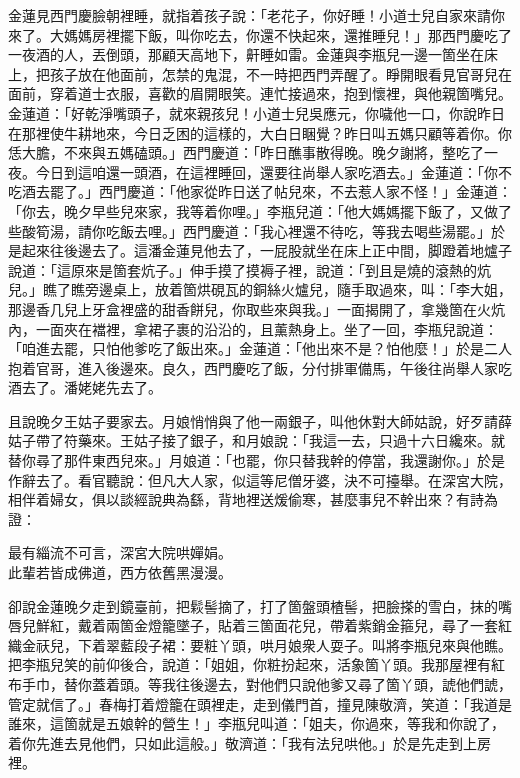 金蓮見西門慶臉朝裡睡，就指着孩子說：「老花子，你好睡！小道士兒自家來請你來了。大媽媽房裡擺下飯，叫你吃去，你還不快起來，還推睡兒！」那西門慶吃了一夜酒的人，丟倒頭，那顧天高地下，鼾睡如雷。金蓮與李瓶兒一邊一箇坐在床上，把孩子放在他面前，怎禁的鬼混，不一時把西門弄醒了。睜開眼看見官哥兒在面前，穿着道士衣服，喜歡的眉開眼笑。連忙接過來，抱到懷裡，與他親箇嘴兒。金蓮道：「好乾淨嘴頭子，就來親孩兒！小道士兒吳應元，你噦他一口，你說昨日在那裡使牛耕地來，今日乏困的這樣的，大白日睏覺？昨日叫五媽只顧等着你。你恁大膽，不來與五媽磕頭。」{}西門慶道：「昨日醮事散得晚。晚夕謝將，整吃了一夜。今日到這咱還一頭酒，在這裡睡回，還要往尚舉人家吃酒去。」金蓮道：「你不吃酒去罷了。」西門慶道：「他家從昨日送了帖兒來，不去惹人家不怪！」金蓮道：「你去，晚夕早些兒來家，我等着你哩。」李瓶兒道：「他大媽媽擺下飯了，又做了些酸筍湯，請你吃飯去哩。」西門慶道：「我心裡還不待吃，等我去喝些湯罷。」於是起來往後邊去了。這潘金蓮見他去了，一屁股就坐在床上正中間，脚蹬着地爐子說道：「這原來是箇套炕子。」伸手摸了摸褥子裡，說道：「到且是燒的滾熱的炕兒。」瞧了瞧旁邊桌上，放着箇烘硯瓦的銅絲火爐兒，隨手取過來，叫：「李大姐，那邊香几兒上牙盒裡盛的甜香餅兒，你取些來與我。」一面揭開了，拿幾箇在火炕內，一面夾在襠裡，拿裙子裹的沿沿的，且薰熱身上。坐了一回，李瓶兒說道：「咱進去罷，只怕他爹吃了飯出來。」金蓮道：「他出來不是？怕他麼！」於是二人抱着官哥，進入後邊來。良久，西門慶吃了飯，分付排軍備馬，午後往尚舉人家吃酒去了。潘姥姥先去了。

且說晚夕王姑子要家去。月娘悄悄與了他一兩銀子，叫他休對大師姑說，好歹請薛姑子帶了符藥來。王姑子接了銀子，和月娘說：「我這一去，只過十六日纔來。就替你尋了那件東西兒來。」月娘道：「也罷，你只替我幹的停當，我還謝你。」於是作辭去了。看官聽說：但凡大人家，似這等尼僧牙婆，決不可擡舉。在深宮大院，相伴着婦女，俱以談經說典為繇，背地裡送煖偷寒，甚麼事兒不幹出來？有詩為證：

\begin{myquote}
最有緇流不可言，深宮大院哄嬋娟。\\此輩若皆成佛道，西方依舊黑漫漫。
\end{myquote}

卻說金蓮晚夕走到鏡臺前，把鬏髻摘了，打了箇盤頭楂髻，把臉搽的雪白，抹的嘴唇兒鮮紅，戴着兩箇金燈籠墜子，貼着三箇面花兒，帶着紫銷金箍兒，尋了一套紅織金祆兒，下着翠藍段子裙：要粧丫頭，哄月娘衆人耍子。叫將李瓶兒來與他瞧。把李瓶兒笑的前仰後合，說道：「姐姐，你粧扮起來，活象箇丫頭。我那屋裡有紅布手巾，替你蓋着頭。等我往後邊去，對他們只說他爹又尋了箇丫頭，諕他們諕，{}管定就信了。」春梅打着燈籠在頭裡走，走到儀門首，撞見陳敬濟，笑道：「我道是誰來，這箇就是五娘幹的營生！」李瓶兒叫道：「姐夫，你過來，等我和你說了，着你先進去見他們，只如此這般。」敬濟道：「我有法兒哄他。」於是先走到上房裡。

